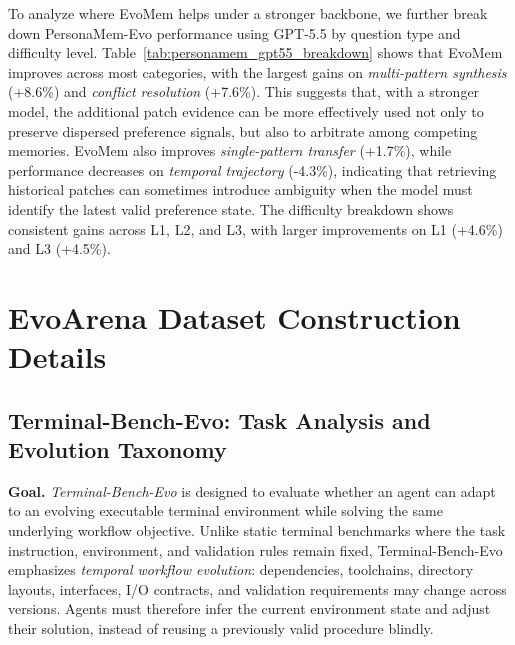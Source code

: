 \documentclass{article}
\begin{document}
To analyze where EvoMem helps under a stronger backbone, we further break down PersonaMem-Evo performance using GPT-5.5 by question type and difficulty level. Table~\ref{tab:personamem_gpt55_breakdown} shows that EvoMem improves across most categories, with the largest gains on \emph{multi-pattern synthesis} (+8.6\%) and \emph{conflict resolution} (+7.6\%). This suggests that, with a stronger model, the additional patch evidence can be more effectively used not only to preserve dispersed preference signals, but also to arbitrate among competing memories. EvoMem also improves \emph{single-pattern transfer} (+1.7\%), while performance decreases on \emph{temporal trajectory} (-4.3\%), indicating that retrieving historical patches can sometimes introduce ambiguity when the model must identify the latest valid preference state. The difficulty breakdown shows consistent gains across L1, L2, and L3, with larger improvements on L1 (+4.6\%) and L3 (+4.5\%).










\section{EvoArena Dataset Construction Details}













\subsection{Terminal-Bench-Evo: Task Analysis and Evolution Taxonomy}
\label{app:terminal}
\label{app:terminal_analysis}

\textbf{Goal.}
\emph{Terminal-Bench-Evo} is designed to evaluate whether an agent can adapt to an evolving executable terminal environment while solving the same underlying workflow objective. Unlike static terminal benchmarks where the task instruction, environment, and validation rules remain fixed, Terminal-Bench-Evo emphasizes \emph{temporal workflow evolution}: dependencies, toolchains, directory layouts, interfaces, I/O contracts, and validation requirements may change across versions. Agents must therefore infer the current environment state and adjust their solution, instead of reusing a previously valid procedure blindly.
\end{document}
